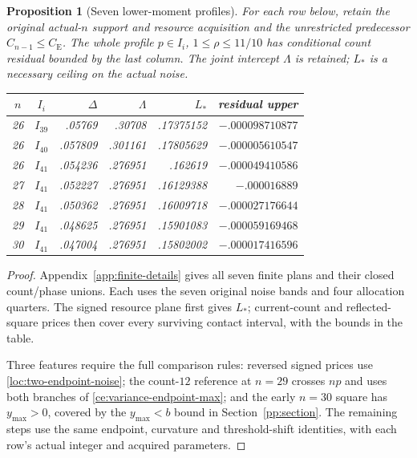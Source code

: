 \documentclass[aop,preprint]{imsart}
\newtheorem{proposition}[theorem]{Proposition}
\theoremstyle{definition}
\newcommand{\CE}{C_{\mathrm E}}
\numberwithin{equation}{section}
\begin{document}
\begin{proposition}[Seven lower-moment profiles]\label{fc:lowprofiles}
For each row below, retain the original actual-$n$ support and resource
acquisition and the unrestricted predecessor $C_{n-1}\le\CE$.
The whole profile $p\in I_i$, $1\le\rho\le11/10$ has conditional
count residual bounded by the last column. The joint intercept
$\Lambda$ is retained; $L_*$ is a necessary ceiling on the actual noise.
\begin{center}\small\setlength{\tabcolsep}{3pt}
\begin{tabular}{ccrrrr}\toprule
$n$ & $I_i$ & $\Delta$ & $\Lambda$ & $L_*$ & residual upper\\\midrule
26 & $I_{39}$ & .05769 & .30708 & .17375152 & $-.000098710877$\\
26 & $I_{40}$ & .057809 & .301161 & .17805629 & $-.000005610547$\\
26 & $I_{41}$ & .054236 & .276951 & .162619 & $-.000049410586$\\
27 & $I_{41}$ & .052227 & .276951 & .16129388 & $-.000016889$\\
28 & $I_{41}$ & .050362 & .276951 & .16009718 & $-.000027176644$\\
29 & $I_{41}$ & .048625 & .276951 & .15901083 & $-.000059169468$\\
30 & $I_{41}$ & .047004 & .276951 & .15802002 & $-.000017416596$\\
\bottomrule\end{tabular}\end{center}
\end{proposition}
\begin{proof}
Appendix~\ref{app:finite-details} gives all seven finite plans and their
closed count/phase unions. Each uses the seven original noise bands and
four allocation quarters. The signed resource plane first gives $L_*$;
current-count and reflected-square prices then cover every surviving
contact interval, with the bounds in the table.

Three features require the full comparison rules: reversed signed
prices use \eqref{loc:two-endpoint-noise}; the count-$12$ reference at
$n=29$ crosses $np$ and uses both branches of
\eqref{ce:variance-endpoint-max}; and the early $n=30$ square has
$y_{\max}>0$, covered by the $y_{\max}<b$ bound in Section~\ref{pp:section}.
The remaining steps use the same endpoint, curvature and threshold-shift
identities, with each row's actual integer and acquired parameters.
\end{proof}
\end{document}
